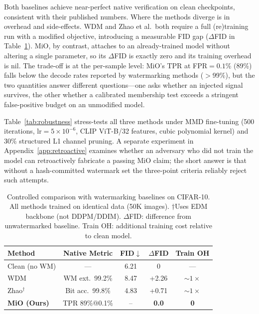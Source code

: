 \documentclass{article}
\begin{document}
Both baselines achieve near-perfect native verification on clean
checkpoints, consistent with their published numbers.  Where the
methods diverge is in overhead and side-effects.  WDM and Zhao
et al.\ both require a full (re)training run with a modified
objective, introducing a measurable FID gap ($\Delta$FID in
Table~\ref{tab:watermark_comparison}).  MiO, by contrast, attaches to
an already-trained model without altering a single parameter, so its
$\Delta$FID is exactly zero and its training overhead is nil.
The trade-off is at the per-sample level: MiO's TPR at
FPR${}\!=\!0.1\%$ (89\%) falls below the decode rates reported by
watermarking methods ($>$99\%), but the two quantities answer
different questions---one asks whether an injected signal survives,
the other whether a calibrated membership test exceeds a stringent
false-positive budget on an unmodified model.

Table~\ref{tab:robustness} stress-tests all three methods under
MMD fine-tuning (500 iterations, lr${}\!=\!5\!\times\!10^{-6}$, CLIP
ViT-B/32 features, cubic polynomial kernel) and 30\% structured
L1 channel pruning.  A separate experiment in
Appendix~\ref{app:retroactive} examines whether an adversary who
did not train the model can retroactively fabricate a passing MiO
claim; the short answer is that without a hash-committed watermark set
the three-point criteria reliably reject such attempts.
\begin{table}[t]
\caption{Controlled comparison with watermarking baselines on CIFAR-10.
All methods trained on identical data (50K images).
$\dagger$Uses EDM backbone (not DDPM/DDIM).
$\Delta$FID: difference from unwatermarked baseline.
Train OH: additional training cost relative to clean model.}
\label{tab:watermark_comparison}
\vskip 0.1in
\centering
\small
\begin{tabular}{@{}lcccc@{}}
\toprule
Method & Native Metric & FID$\downarrow$ & $\Delta$FID & Train OH \\
\midrule
Clean (no WM) & --- & 6.21 & 0 & --- \\
\addlinespace
WDM & WM ext.\ 99.2\% & 8.47 & +2.26 & ${\sim}1\times$ \\
Zhao$^\dagger$ & Bit acc.\ 99.8\% & 4.83 & +0.71 & ${\sim}1\times$ \\
\addlinespace
\textbf{MiO (Ours)} & TPR 89\%@0.1\% & -- & \textbf{0.0} & \textbf{0} \\
\bottomrule
\end{tabular}
\end{table}
\end{document}
